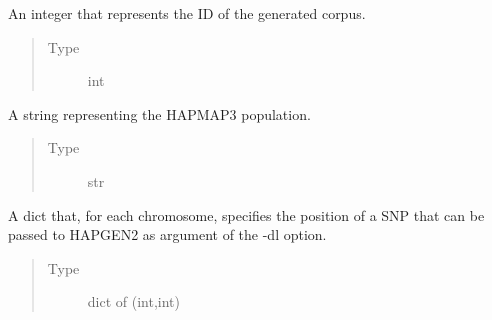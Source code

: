 \documentclass[a4paper,10pt,english]{sphinxhowto}
\begin{document}
\begin{fulllineitems}
\begin{fulllineitems}
\begin{quote}
\begin{description}
\end{description}\end{quote}

\end{fulllineitems}


\begin{fulllineitems}
\label{\detokenize{utils:utils.genotype_corpus_generator.GenotypeCorpusGenerator.corpus_id}}
An integer that represents the ID of the generated corpus.
\begin{quote}\begin{description}
\item[{Type}] \leavevmode
int

\end{description}\end{quote}

\end{fulllineitems}


\begin{fulllineitems}
\label{\detokenize{utils:utils.genotype_corpus_generator.GenotypeCorpusGenerator.pop}}
A string representing the HAPMAP3 population.
\begin{quote}\begin{description}
\item[{Type}] \leavevmode
str

\end{description}\end{quote}

\end{fulllineitems}


\begin{fulllineitems}
\label{\detokenize{utils:utils.genotype_corpus_generator.GenotypeCorpusGenerator.dummy_disease_snps}}
A dict that, for each chromosome, specifies the position
of a SNP that can be passed to HAPGEN2 as argument of the -dl option.
\begin{quote}\begin{description}
\item[{Type}] \leavevmode
dict of (int,int)


\end{description}
\end{quote}
\end{fulllineitems}
\end{fulllineitems}
\end{document}
